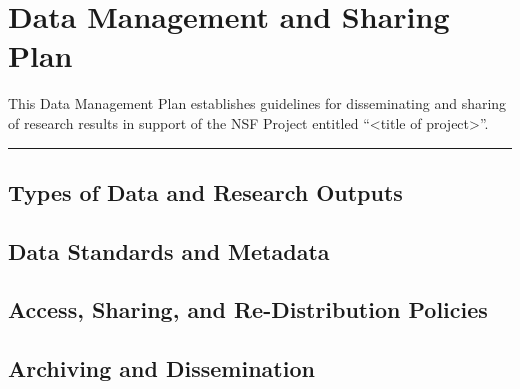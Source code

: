 \documentclass[../preamble.tex]{subfiles}
\begin{document}
\section{Data Management {and} Sharing Plan}

This Data Management Plan establishes guidelines for disseminating and sharing of research results in support of the NSF Project entitled ``<title of project>''. 
\vpn\rule{\textwidth}{0.4pt}

\subsection{Types of Data and Research Outputs}

\subsection{Data Standards and Metadata}

\subsection{Access, Sharing, and Re-Distribution Policies}

\subsection{Archiving and Dissemination}
\end{document}
